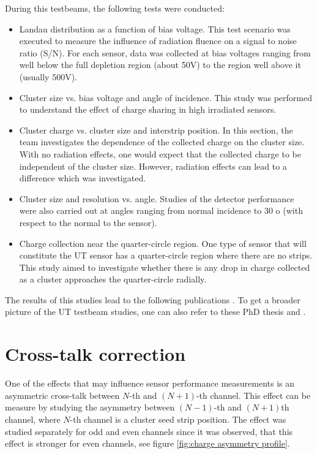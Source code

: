 During this testbeams, the following tests were conducted: 

\begin{itemize}
\item Landau distribution as a function of bias voltage. This test scenario was executed to measure the influence of radiation fluence on a signal to noise ratio (S/N).  For each sensor, data was collected at bias voltages ranging from well below the full depletion region (about 50V) to the region well above it (usually 500V).
\item  Cluster size vs. bias voltage and angle of incidence.  This study was performed to understand the effect of charge sharing in high irradiated sensors. 
\item Cluster charge vs. cluster size and interstrip position. In this section, the team investigates the dependence of the collected charge on the cluster size. With no radiation effects, one would expect that the collected charge to be independent of the cluster size. However, radiation effects can lead to a difference which was investigated. 
\item Cluster size and resolution vs. angle.  Studies of the detector performance were also carried out at angles ranging from normal incidence to 30 o (with respect to the normal to the sensor). 
\item Charge collection near the quarter-circle region. One type of sensor that will constitute the UT sensor has a quarter-circle region where there are no strips. This study aimed to investigate whether there is any drop in charge collected as a cluster approaches the quarter-circle radially. 
\end{itemize}

The results of this studies lead to the following publications \cite{tb1} \cite{tb2} \cite{tb3}. To get a broader picture of the UT testbeam studies, one can also refer to these PhD thesis \cite{Federica} and \cite{Kelsey}.


\section{Cross-talk correction}
\label{sec:cross_talk}
One of the effects that may influence sensor performance measurements is an asymmetric cross-talk between $N$-th and $(N+1)$-th channel. This effect can be measure by studying the asymmetry between $(N-1)$-th and $(N+1)$th channel, where $N$-th channel is a cluster seed strip position. The effect was studied separately for odd and even channels since it was observed, that this effect is stronger for even channels, see figure \ref{fig:charge asymmetry profile}.  


